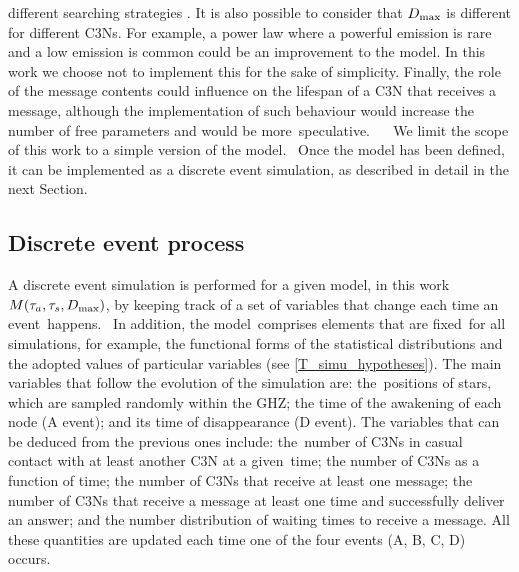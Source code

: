 \documentclass[crop]{CSLB}
\newcommand{\ceti}{C3N}
\newcommand{\cetis}{C3Ns}
\begin{document}
different searching strategies \citep{hippke_interstellar_2017}. 
%
It is also possible to consider that $D_{\rm max}$ is different for different
\cetis{}.
%
For example, a power law where a powerful emission is rare and a low emission
is common could be an improvement to the model.
%
In this work we choose not to implement this for the sake of simplicity.
%
Finally, the role of the message contents could influence on the lifespan of a
\ceti{} that receives a message, although the implementation of such behaviour
would increase the number of free parameters and would be more speculative.   
%
We limit the scope of this work to a simple version of the model. 
%
Once the model has been defined, it can be implemented as a discrete event
simulation, as described in detail in the next Section.


\subsection{Discrete event process}

A discrete event simulation is performed for a given model, in this
work $M(\tau_a, \tau_s,
D_{\rm max})$, by keeping track of a set of variables that change each time an
event happens. 
%
In addition, the model comprises elements that are fixed for all simulations,
for example, the functional forms of the statistical distributions and the
adopted values of particular variables (see \ref{T_simu_hypotheses}).
%
The main variables that follow the evolution of the simulation are:
the positions of stars, which are sampled randomly within the GHZ; the time of
the awakening of each node (A event); and its time of disappearance (D event).
%
The variables that can be deduced from the previous ones include: the number of
\cetis{} in casual contact with at least another \ceti{} at a given time; the
number of \cetis{} as a function of time; the number of \cetis{} that receive at
least one message; the number of \cetis{} that receive a message at
least one time and successfully deliver an answer; and the number distribution
of waiting times to receive a message.
%
All these quantities are updated each time one of the four events (A, B, C, D)
occurs.   
\end{document}
